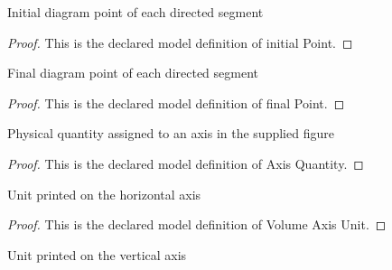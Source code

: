 \begin{definition}
  \label{def:physics:phyx-mini-0402:phyxminiproblems-problemphyxmini0402-processsegment-initialpoint}
  Initial diagram point of each directed segment
\end{definition}
\begin{proof}
  This is the declared model definition of initial Point.
\end{proof}
\begin{definition}
  \label{def:physics:phyx-mini-0402:phyxminiproblems-problemphyxmini0402-processsegment-finalpoint}
  Final diagram point of each directed segment
\end{definition}
\begin{proof}
  This is the declared model definition of final Point.
\end{proof}
\begin{definition}
  \label{def:physics:phyx-mini-0402:phyxminiproblems-problemphyxmini0402-axisquantity}
  Physical quantity assigned to an axis in the supplied figure
\end{definition}
\begin{proof}
  This is the declared model definition of Axis Quantity.
\end{proof}
\begin{definition}
  \label{def:physics:phyx-mini-0402:phyxminiproblems-problemphyxmini0402-volumeaxisunit}
  Unit printed on the horizontal axis
\end{definition}
\begin{proof}
  This is the declared model definition of Volume Axis Unit.
\end{proof}
\begin{definition}
  \label{def:physics:phyx-mini-0402:phyxminiproblems-problemphyxmini0402-pressureaxisunit}
  Unit printed on the vertical axis
\end{definition}
